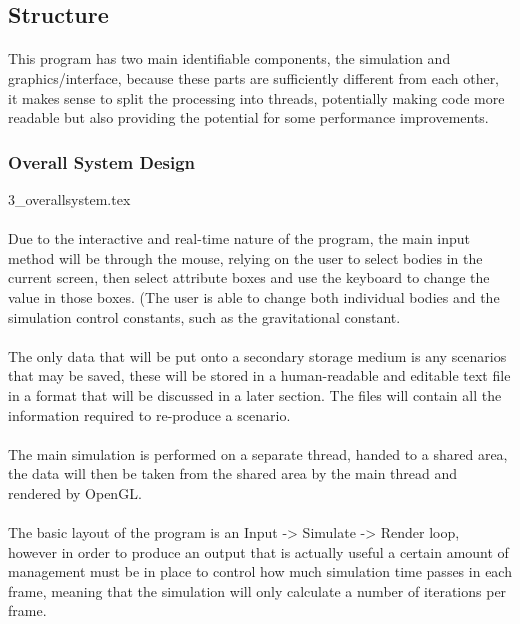 \subsection{Structure}
\paragraph{}
This program has two main identifiable components, the simulation and graphics/interface, because these parts are sufficiently different from each other, it makes sense to split the processing into threads, potentially making code more readable but also providing the potential for some performance improvements.

\subsubsection{Overall System Design}
{3_overallsystem.tex}

\paragraph{}
Due to the interactive and real-time nature of the program, the main input method will be through the mouse, relying on the user to select bodies in the current screen, then select attribute boxes and use the keyboard to change the value in those boxes. (The user is able to change both individual bodies and the simulation control constants, such as the gravitational constant.

\paragraph{}
The only data that will be put onto a secondary storage medium is any scenarios that may be saved, these will be stored in a human-readable and editable text file in a format that will be discussed in a later section. The files will contain all the information required to re-produce a scenario.

\paragraph{}
The main simulation is performed on a separate thread, handed to a shared area, the data will then be taken from the shared area by the main thread and rendered by OpenGL.

\paragraph{}
The basic layout of the program is an Input -> Simulate -> Render loop, however in order to produce an output that is actually useful a certain amount of management must be in place to control how much simulation time passes in each frame, meaning that the simulation will only calculate a number of iterations per frame.

